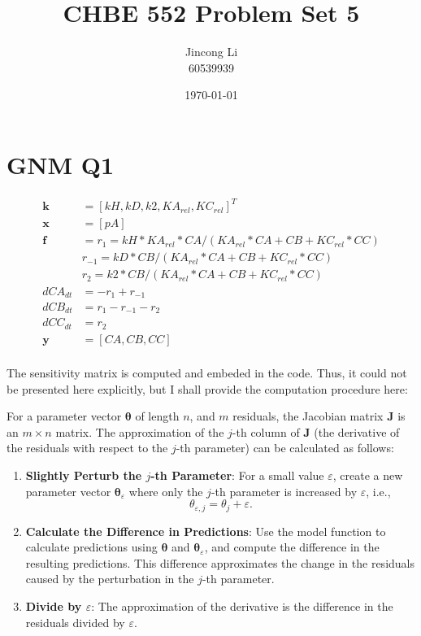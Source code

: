 \documentclass[a4paper,12pt]{article} %
\begin{document}
\setlength{\parskip}{1em} 
\setlength{\parindent}{0pt}
\newcommand{\vect}[1]{\mathbf{#1}}

\title{CHBE 552 Problem Set 5}
\author{Jincong Li \\ 60539939}
\date{\today}
\maketitle
\section*{GNM Q1}
\begin{align*}
    \vect{k} &= [kH, kD, k2, KA_{rel}, KC_{rel}]^T \\
    \vect{x} &= [pA]\\
    \vect{f} &= r_1 = kH * KA_{rel} * CA / (KA_{rel} * CA +  CB +  KC_{rel}*CC) \\
    &r_{-1} = kD * CB / (KA_{rel} * CA +  CB +  KC_{rel}*CC)\\
    &r_2 = k2 * CB / (KA_{rel} * CA +  CB +  KC_{rel}*CC)\\
    dCA_{dt} &= -r_1 + r_{-1} \\
    dCB_{dt} &= r_1 - r_{-1} - r_2\\
    dCC_{dt} &= r_2  \\
    \vect{y} &= [CA, CB, CC]\\
\end{align*} 

The sensitivity matrix is computed and embeded in the code. Thus, it could not be presented here explicitly, but I shall provide
the computation procedure here:

For a parameter vector $\boldsymbol{\theta}$ of length $n$, and $m$ residuals, the Jacobian matrix $\mathbf{J}$ is an $m \times n$ matrix. The approximation of the $j$-th column of $\mathbf{J}$ (the derivative of the residuals with respect to the $j$-th parameter) can be calculated as follows:

\begin{enumerate}
    \item \textbf{Slightly Perturb the $j$-th Parameter}: For a small value $\varepsilon$, create a new parameter vector $\boldsymbol{\theta}_\varepsilon$ where only the $j$-th parameter is increased by $\varepsilon$, i.e., 
    \[ \theta_{\varepsilon,j} = \theta_j + \varepsilon. \]
    
    \item \textbf{Calculate the Difference in Predictions}: Use the model function to calculate predictions using $\boldsymbol{\theta}$ and $\boldsymbol{\theta}_\varepsilon$, and compute the difference in the resulting predictions. This difference approximates the change in the residuals caused by the perturbation in the $j$-th parameter.
    
    \item \textbf{Divide by $\varepsilon$}: The approximation of the derivative is the difference in the residuals divided by $\varepsilon$.
\end{enumerate}
\end{document}
